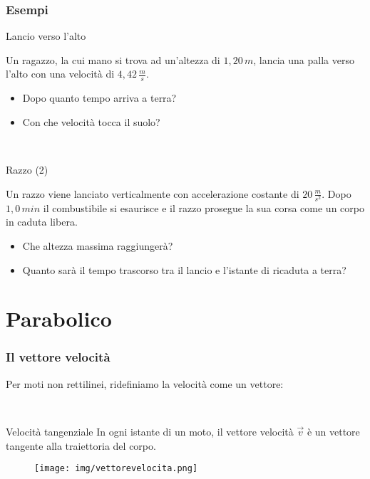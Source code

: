 \documentclass[]{beamer}
\theoremstyle{plain}
\begin{document}
\begin{frame}
\frametitle{Esempi}
\begin{exampleblock}{Lancio verso l'alto}
\begin{small}
Un ragazzo, la cui mano si trova ad un'altezza di $ 1,20 \, m $, lancia una palla verso l'alto con una velocità di $ 4,42 \, \frac{m}{s} $.
\begin{itemize}
  \item Dopo quanto tempo arriva a terra?
  \item Con che velocità tocca il suolo?
\end{itemize}
\end{small}
\end{exampleblock}

~


\begin{exampleblock}{Razzo (2)}
\begin{small}
Un razzo viene lanciato verticalmente con accelerazione costante di $ 20 \, \frac{m}{s^2} $. Dopo $ 1,0 \, min $ il combustibile si esaurisce e il razzo prosegue la sua corsa come un corpo in caduta libera.
\begin{itemize}
  \item Che altezza massima raggiungerà?
  \item Quanto sarà il tempo trascorso tra il lancio e l'istante di ricaduta a terra?
\end{itemize}
\end{small}
\end{exampleblock}

\end{frame}



\section{Parabolico}


\begin{frame}
\frametitle{Il vettore velocità}
Per moti non rettilinei, ridefiniamo la velocità come un vettore:

~

\begin{block}{Velocità tangenziale}
In ogni istante di un moto, il vettore velocità $ \vec{v} $ è un vettore \alert{tangente alla traiettoria} del corpo.
\end{block}

\begin{figure}
\texttt{[image: img/vettorevelocita.png]}
\end{figure}


\end{frame}
\end{document}

